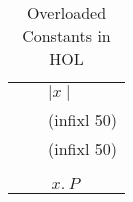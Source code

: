 \begin{isabellebody}
\begin{isamarkuptext}
\begin{table}[htbp]
\begin{center}
\begin{tabular}{lll}
\isa{abs} &  \isa{{\isacharparenleft}{\isacharprime}a{\isacharcolon}{\isacharcolon}minus{\isacharparenright}\ {\isasymRightarrow}\ {\isacharprime}a} & ${\mid} x {\mid}$\\
\isa{{\isasymle}} & \isa{{\isacharparenleft}{\isacharprime}a{\isacharcolon}{\isacharcolon}ord{\isacharparenright}\ {\isasymRightarrow}\ {\isacharprime}a\ {\isasymRightarrow}\ bool} & (infixl 50) \\
\isa{{\isacharless}} & \isa{{\isacharparenleft}{\isacharprime}a{\isacharcolon}{\isacharcolon}ord{\isacharparenright}\ {\isasymRightarrow}\ {\isacharprime}a\ {\isasymRightarrow}\ bool} & (infixl 50) \\
\isa{min} &  \isa{{\isacharparenleft}{\isacharprime}a{\isacharcolon}{\isacharcolon}ord{\isacharparenright}\ {\isasymRightarrow}\ {\isacharprime}a\ {\isasymRightarrow}\ {\isacharprime}a} \\
\isa{max} &  \isa{{\isacharparenleft}{\isacharprime}a{\isacharcolon}{\isacharcolon}ord{\isacharparenright}\ {\isasymRightarrow}\ {\isacharprime}a\ {\isasymRightarrow}\ {\isacharprime}a} \\
\isa{Least} & \isa{{\isacharparenleft}{\isacharprime}a{\isacharcolon}{\isacharcolon}ord\ {\isasymRightarrow}\ bool{\isacharparenright}\ {\isasymRightarrow}\ {\isacharprime}a} &
\isa{LEAST}$~x.~P$
\end{tabular}
\caption{Overloaded Constants in HOL}
\label{tab:overloading}
\end{center}
\end{table}%
\end{isamarkuptext}%
\end{isabellebody}%
